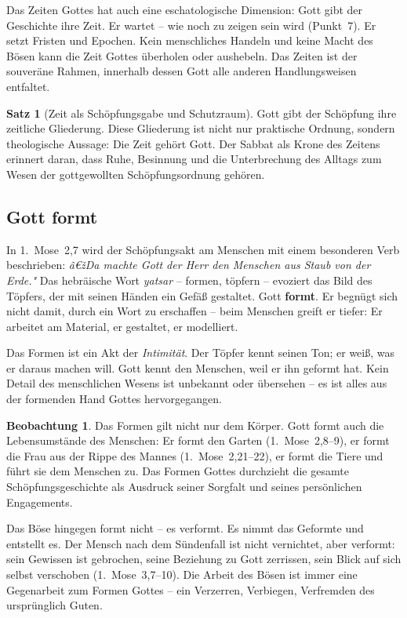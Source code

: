 ﻿\documentclass[a4paper,12pt]{article}
\theoremstyle{definition}
\newtheorem{theorem}{Satz}[section]
\newtheorem{observation}{Beobachtung}[section]
\begin{document}
Das Zeiten Gottes hat auch eine eschatologische Dimension: Gott gibt der Geschichte
ihre Zeit. Er wartet -- wie noch zu zeigen sein wird (Punkt~7). Er setzt Fristen
und Epochen. Kein menschliches Handeln und keine Macht des Bösen kann die Zeit
Gottes überholen oder aushebeln. Das Zeiten ist der souveräne Rahmen, innerhalb
dessen Gott alle anderen Handlungsweisen entfaltet.

\begin{theorem}[Zeit als Schöpfungsgabe und Schutzraum]
	Gott gibt der Schöpfung ihre zeitliche Gliederung. Diese Gliederung ist nicht
	nur praktische Ordnung, sondern theologische Aussage: Die Zeit gehört Gott.
	Der Sabbat als Krone des Zeitens erinnert daran, dass Ruhe, Besinnung und die
	Unterbrechung des Alltags zum Wesen der gottgewollten Schöpfungsordnung gehören.
\end{theorem}

\subsection{Gott formt}

In 1.~Mose~2,7 wird der Schöpfungsakt am Menschen mit einem besonderen Verb
beschrieben: \textit{â€žDa machte Gott der Herr den Menschen aus Staub von der Erde."} 
Das hebräische Wort \textit{yatsar} -- formen, töpfern -- evoziert das Bild des
Töpfers, der mit seinen Händen ein Gefäß gestaltet. Gott \textbf{formt}. Er
begnügt sich nicht damit, durch ein Wort zu erschaffen -- beim Menschen greift
er tiefer: Er arbeitet am Material, er gestaltet, er modelliert.

Das Formen ist ein Akt der \textit{Intimität}. Der Töpfer kennt seinen Ton; er
weiß, was er daraus machen will. Gott kennt den Menschen, weil er ihn geformt
hat. Kein Detail des menschlichen Wesens ist unbekannt oder übersehen -- es ist
alles aus der formenden Hand Gottes hervorgegangen.

\begin{observation}
	Das Formen gilt nicht nur dem Körper. Gott formt auch die Lebensumstände des
	Menschen: Er formt den Garten (1.~Mose~2,8--9), er formt die Frau aus der Rippe
	des Mannes (1.~Mose~2,21--22), er formt die Tiere und führt sie dem Menschen
	zu. Das Formen Gottes durchzieht die gesamte Schöpfungsgeschichte als Ausdruck
	seiner Sorgfalt und seines persönlichen Engagements.
\end{observation}

Das Böse hingegen formt nicht -- es verformt. Es nimmt das Geformte und entstellt
es. Der Mensch nach dem Sündenfall ist nicht vernichtet, aber verformt: sein
Gewissen ist gebrochen, seine Beziehung zu Gott zerrissen, sein Blick auf sich
selbst verschoben (1.~Mose~3,7--10). Die Arbeit des Bösen ist immer eine
Gegenarbeit zum Formen Gottes -- ein Verzerren, Verbiegen, Verfremden des
ursprünglich Guten.
\end{document}
